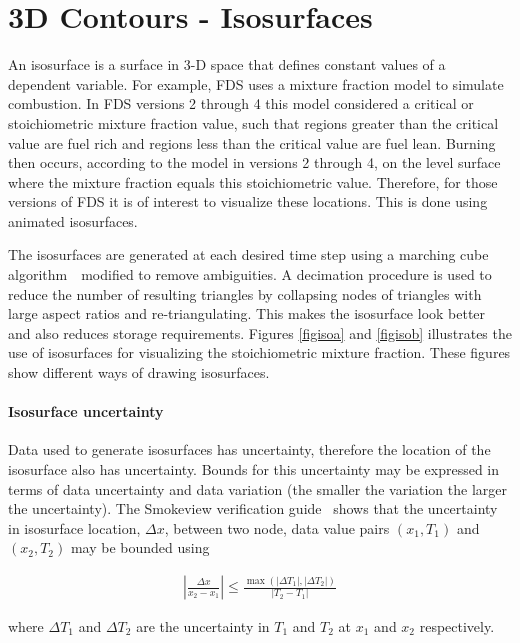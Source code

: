 \documentclass[11pt,twoside]{book}
\begin{document}
%
%

\clearpage
\section{3D Contours - Isosurfaces}
An isosurface is a surface in 3-D space that defines constant
values of a dependent variable. For example, FDS uses a mixture
fraction model to simulate combustion. In FDS versions 2 through 4
this model considered a critical or stoichiometric mixture fraction
value, such that regions greater than the critical value are fuel
rich and regions less than the critical value are fuel lean.
Burning then occurs, according to the model in versions 2 through
4, on the level surface where the mixture fraction equals this
stoichiometric value. Therefore, for those versions of FDS it is of
interest to visualize these locations. This is done using animated
isosurfaces.

The isosurfaces are generated at each desired time step using a
marching cube algorithm~\cite{marchingcubes}\ modified to remove
ambiguities. A decimation procedure is used to reduce the number
of resulting triangles by collapsing nodes of triangles with large
aspect ratios and re-triangulating. This makes the isosurface look
better and also reduces storage requirements. Figures
\ref{figisoa} and \ref{figisob} illustrates the use of isosurfaces
for visualizing the stoichiometric mixture fraction. These figures
show different ways of drawing isosurfaces.

\paragraph{Isosurface uncertainty} Data used to generate isosurfaces has uncertainty, therefore the location of the isosurface
also has uncertainty.  Bounds for this uncertainty may be expressed in terms of data uncertainty and data variation (the smaller the variation the larger the uncertainty).
The Smokeview verification guide~\cite{Smokeview_Verification_Guide} shows that the uncertainty in isosurface location, $\Delta x$, between two node, data value pairs $(x_1,T_1)$ and $(x_2,T_2)$  may be bounded using

\begin{eqnarray*}
\left|\frac{\Delta x}{x_2-x_1}\right|\le
\frac{\max(|\Delta T_1|,|\Delta T_2|)}{|T_2-T_1|}
\end{eqnarray*}

\noindent where $\Delta T_1$ and $\Delta T_2$ are the uncertainty in $T_1$ and $T_2$ at $x_1$ and $x_2$ respectively.
\end{document}
